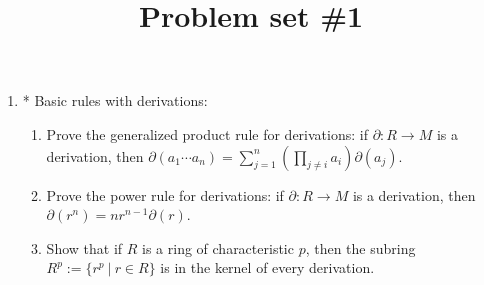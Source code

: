 \documentclass{amsart}[12pt]
\title{Problem set \#1}
\numberwithin{equation}{section}
\theoremstyle{plain} %
\theoremstyle{definition}
\theoremstyle{remark}
\begin{document}
\onehalfspacing

\maketitle


\vspace{-1mm}

\begin{enumerate}


\item* Basic rules with derivations:
\begin{enumerate}
\item Prove the generalized product rule for derivations: if $\partial:R\to M$ is a derivation, then $\partial( a_1\cdots a_n) = \sum_{j=1}^n (\prod_{j\neq i} a_i)  \partial(a_j)$.
\item Prove the power rule for derivations: if $\partial:R\to M$ is a derivation, then $\partial(r^n) = n r^{n-1} \partial(r)$.
\item Show that if $R$ is a ring of characteristic $p$, then the subring $R^p:=\{ r^p \ | \ r\in R\}$ is in the kernel of every derivation.
\end{enumerate}

\
 




\end{enumerate}
\end{document}
